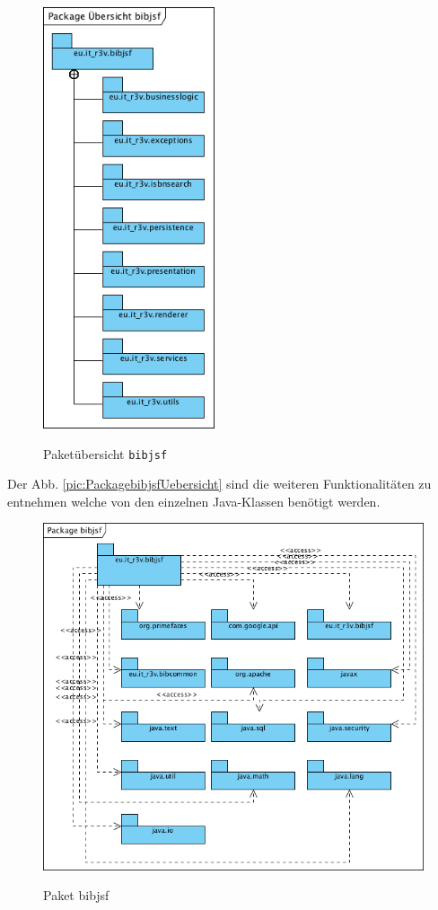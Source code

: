 \documentclass[fontsize=12pt,paper=a4,twoside]{scrartcl}
\begin{document}
\begin{figure} [H] 
\caption{Paketübersicht \texttt{bibjsf}} \centering
	\includegraphics[width=0.45\textwidth]{Diagramme/Packagebibjsfuebersicht.png} 
	\label{pic:Packagebibjsf} 
\end{figure}

Der Abb. \vref{pic:PackagebibjsfUebersicht} sind die weiteren Funktionalitäten zu entnehmen welche von den einzelnen Java-Klassen benötigt werden.


\begin{figure} [H] 
\caption{Paket bibjsf} \centering
	\includegraphics[width=1\textwidth]{Diagramme/Packagebibjsf.png} 
	\label{pic:PackagebibjsfUebersicht} 
\end{figure}
\end{document}

